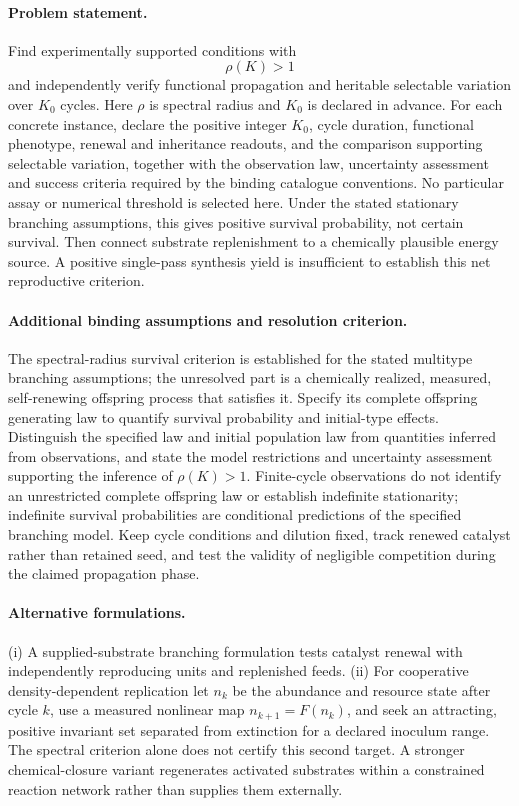 \documentclass[11pt]{article}
\begin{document}
\paragraph{Problem statement.} Find experimentally supported conditions with
\[
\rho(K)>1
\]
and independently verify functional propagation and heritable selectable variation over $K_0$ cycles. Here $\rho$ is spectral radius and $K_0$ is declared in advance. For each concrete instance, declare the positive integer $K_0$, cycle duration, functional phenotype, renewal and inheritance readouts, and the comparison supporting selectable variation, together with the observation law, uncertainty assessment and success criteria required by the binding catalogue conventions. No particular assay or numerical threshold is selected here. Under the stated stationary branching assumptions, this gives positive survival probability, not certain survival. Then connect substrate replenishment to a chemically plausible energy source. A positive single-pass synthesis yield is insufficient to establish this net reproductive criterion.

\paragraph{Additional binding assumptions and resolution criterion.} The spectral-radius survival criterion is established for the stated multitype branching assumptions; the unresolved part is a chemically realized, measured, self-renewing offspring process that satisfies it. Specify its complete offspring generating law to quantify survival probability and initial-type effects. Distinguish the specified law and initial population law from quantities inferred from observations, and state the model restrictions and uncertainty assessment supporting the inference of $\rho(K)>1$. Finite-cycle observations do not identify an unrestricted complete offspring law or establish indefinite stationarity; indefinite survival probabilities are conditional predictions of the specified branching model. Keep cycle conditions and dilution fixed, track renewed catalyst rather than retained seed, and test the validity of negligible competition during the claimed propagation phase.

\paragraph{Alternative formulations.} (i) A supplied-substrate branching formulation tests catalyst renewal with independently reproducing units and replenished feeds. (ii) For cooperative density-dependent replication let $n_k$ be the abundance and resource state after cycle $k$, use a measured nonlinear map $n_{k+1}=F(n_k)$, and seek an attracting, positive invariant set separated from extinction for a declared inoculum range. The spectral criterion alone does not certify this second target. A stronger chemical-closure variant regenerates activated substrates within a constrained reaction network rather than supplies them externally.
\end{document}
